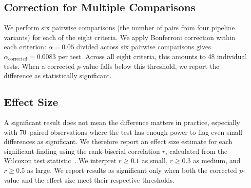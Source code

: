 \subsection{Correction for Multiple Comparisons}
\label{subsec:multiple-comparisons}

We perform six pairwise comparisons (the number of pairs from four pipeline variants) for each of the eight criteria. We apply Bonferroni correction within each criterion: $\alpha = 0.05$ divided across six pairwise comparisons gives $\alpha_{\text{corrected}} = 0.0083$ per test. Across all eight criteria, this amounts to 48 individual tests. When a corrected $p$-value falls below this threshold, we report the difference as statistically significant.

\subsection{Effect Size}
\label{subsec:effect-size}

A significant result does not mean the difference matters in practice, especially with 70~paired observations where the test has enough power to flag even small differences as significant. We therefore report an effect size estimate for each significant finding using the rank-biserial correlation $r$, calculated from the Wilcoxon test statistic~\citep{kerby2014simple}. We interpret $r \geq 0.1$ as small, $r \geq 0.3$ as medium, and $r \geq 0.5$ as large. We report results as significant only when both the corrected $p$-value and the effect size meet their respective thresholds.
